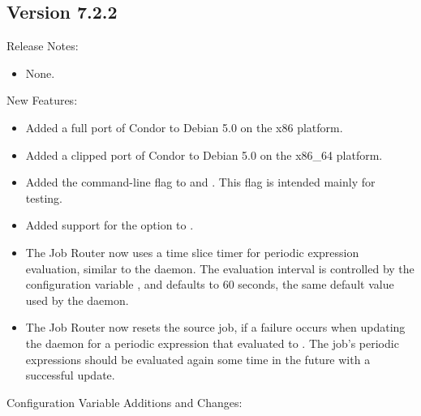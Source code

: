 \subsection*{\label{sec:New-7-2-2}Version 7.2.2}

\noindent Release Notes:

\begin{itemize}

\item None.

\end{itemize}


\noindent New Features:

\begin{itemize}

\item Added a full port of Condor to Debian 5.0 on the x86 platform.

\item Added a clipped port of Condor to Debian 5.0 on the x86\_64 platform.

\item Added the  command-line flag to 
and .  This flag is intended mainly for testing.

\item Added support for the  option to .

\item The Job Router now uses a time slice timer for periodic expression
  evaluation, similar to the  daemon.
  The evaluation interval is controlled by 
  the configuration variable ,
  and defaults to 60 seconds, the same default value used by
  the  daemon.

\item The Job Router now resets the source job, if a failure occurs when
  updating the  daemon for a periodic expression that
  evaluated to .  The job's periodic expressions should be
  evaluated again some time in the future with a successful update.

\end{itemize}

\noindent Configuration Variable Additions and Changes:

